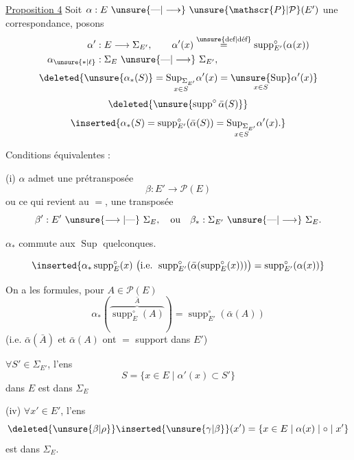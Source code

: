 
\uline{Proposition 4} Soit $\alpha:E\ \unsure{\text{---}|\longrightarrow}\ \unsure{\mathscr{P}|\mathcal{P}}(E')$ une correspondance,  posons
\[
\begin{aligned}
\alpha' &: E\longrightarrow\Sigma_{E'},\qquad \alpha'(x)\overset{\text{\unsure{def|déf}}}=\operatorname{supp}^{\circ}_{E'}(\alpha(x))\\
\alpha_{\unsure{*|\ell}} &: \Sigma_E\ \unsure{\text{---}|\longrightarrow}\ \Sigma_{E'},
\end{aligned}
\]
\[
\deleted{\unsure{\alpha_*(S)}=\underset{x\in S}{\operatorname{Sup}_{\Sigma_{E'}}}\alpha'(x)=\underset{x\in S}{\unsure{\operatorname{Sup}}}\alpha'(x)}
\]
\[
\deleted{\unsure{\operatorname{supp}^{\circ}\bar\alpha(S)}}
\]
\[
\inserted{\alpha_*(S)=\operatorname{supp}^{\circ}_{E'}(\bar\alpha(S))=\underset{x\in S}{\operatorname{Sup}_{\Sigma_{E'}}}\alpha'(x).}
\]

Conditions équivalentes :

(i) $\alpha$ admet une prétransposée
\[
\beta:E'\longrightarrow\mathscr{P}(E)
\]
ou ce qui revient au $=$, une transposée
\[
\beta':E'\ \unsure{\longrightarrow|\text{---}}\ \Sigma_E,\quad\text{ou}\quad\beta_*:\Sigma_{E'}\ \unsure{\text{---}|\longrightarrow}\ \Sigma_E.
\]

  $\alpha_*$ commute aux $\operatorname{Sup}$ quelconques.

\[
\inserted{\alpha_*\operatorname{supp}^{\circ}_E(x)\ \bigl(\text{i.e. }\operatorname{supp}^{\circ}_{E'}(\bar\alpha(\operatorname{supp}^{\circ}_E(x)))\bigr)=\operatorname{supp}^{\circ}_{E'}(\alpha(x))}
\]

 On a les formules, pour \unsure{$\forall$} $A\in\mathscr{P}(E)$
\[
\alpha_*(\overbrace{\operatorname{supp}^{\circ}_E(A)}^{\bar A})=\operatorname{supp}^{\circ}_{E'}(\bar\alpha(A))
\]
(i.e. $\bar\alpha(\bar A)$ et $\bar\alpha(A)$ ont $=$ support dans $E'$)

 $\forall S'\in\Sigma_{E'}$, l'ens
\[
S=\{x\in E\mid\alpha'(x)\subset S'\}
\]
dans $E$ est dans $\Sigma_E$

(iv) $\forall x'\in E'$, l'ens
\[
\deleted{\unsure{\beta|\rho}}\inserted{\unsure{\gamma|\beta}}(x')=\{x\in E\mid\alpha(x)\mid\circ\mid x'\}
\]
est dans $\Sigma_E$.

